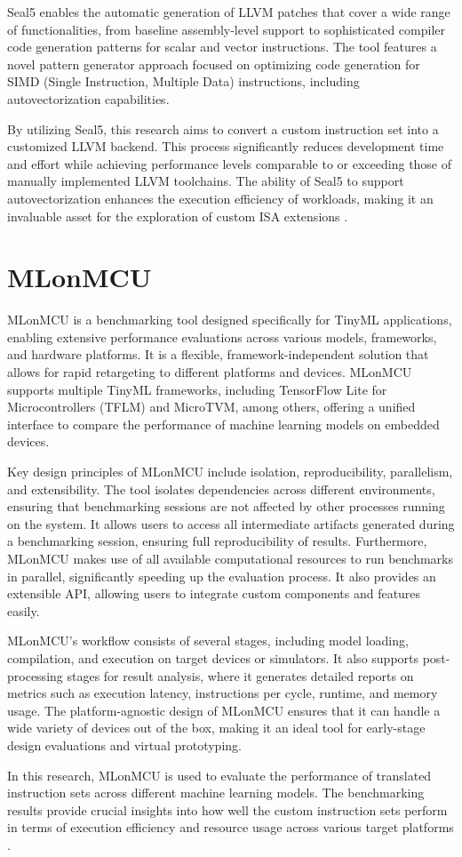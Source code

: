 Seal5 enables the automatic generation of LLVM patches that cover a wide range of functionalities, from baseline assembly-level support to sophisticated compiler code generation patterns for scalar and vector instructions. The tool features a novel pattern generator approach focused on optimizing code generation for SIMD (Single Instruction, Multiple Data) instructions, including autovectorization capabilities.

By utilizing Seal5, this research aims to convert a custom instruction set into a customized LLVM backend. This process significantly reduces development time and effort while achieving performance levels comparable to or exceeding those of manually implemented LLVM toolchains. The ability of Seal5 to support autovectorization enhances the execution efficiency of workloads, making it an invaluable asset for the exploration of custom ISA extensions \cite{Seal5}.

\section{MLonMCU}
MLonMCU is a benchmarking tool designed specifically for TinyML applications, enabling extensive performance evaluations across various models, frameworks, and hardware platforms. It is a flexible, framework-independent solution that allows for rapid retargeting to different platforms and devices. MLonMCU supports multiple TinyML frameworks, including TensorFlow Lite for Microcontrollers (TFLM) and MicroTVM, among others, offering a unified interface to compare the performance of machine learning models on embedded devices.

Key design principles of MLonMCU include isolation, reproducibility, parallelism, and extensibility. The tool isolates dependencies across different environments, ensuring that benchmarking sessions are not affected by other processes running on the system. It allows users to access all intermediate artifacts generated during a benchmarking session, ensuring full reproducibility of results. Furthermore, MLonMCU makes use of all available computational resources to run benchmarks in parallel, significantly speeding up the evaluation process. It also provides an extensible API, allowing users to integrate custom components and features easily.

MLonMCU's workflow consists of several stages, including model loading, compilation, and execution on target devices or simulators. It also supports post-processing stages for result analysis, where it generates detailed reports on metrics such as execution latency, instructions per cycle, runtime, and memory usage. The platform-agnostic design of MLonMCU ensures that it can handle a wide variety of devices out of the box, making it an ideal tool for early-stage design evaluations and virtual prototyping.

In this research, MLonMCU is used to evaluate the performance of translated instruction sets across different machine learning models. The benchmarking results provide crucial insights into how well the custom instruction sets perform in terms of execution efficiency and resource usage across various target platforms \cite{MLonMCU}.